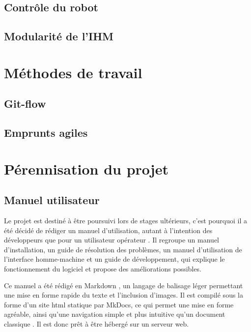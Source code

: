 		\subsection{Contrôle du robot}
		
			
		\subsection{Modularité de l'IHM}
		
			
	\section{Méthodes de travail}

		\subsection{Git-flow}
		
			
		\subsection{Emprunts agiles}
		
			

	\section{Pérennisation du projet}
	
		\subsection{Manuel utilisateur}
		
			Le projet est destiné à être poursuivi lors de stages ultérieurs, c'est pourquoi il a été décidé de rédiger un manuel d'utilisation, autant à l'intention des développeurs que pour un utilisateur \og opérateur \fg{}. Il regroupe un manuel d'installation, un guide de résolution des problèmes, un manuel d'utilisation de l'interface homme-machine et un guide de développement, qui explique le fonctionnement du logiciel et propose des améliorations possibles.
			\par
			Ce manuel a été rédigé en Markdown \cite{markdown}, un langage de balisage léger permettant une mise en forme rapide du texte et l'inclusion d'images. Il est compilé sous la forme d'un site html statique par MkDocs\cite{mkdocs}, ce qui permet une mise en forme agréable, ainsi qu'une navigation simple et plus intuitive qu'un document \og classique \fg{}. Il est donc prêt à être hébergé sur un serveur web.
			

